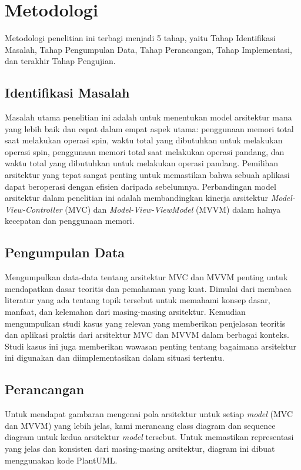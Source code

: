 \documentclass[conference]{IEEEtran}
\begin{document}
	\section{Metodologi}
	Metodologi penelitian ini terbagi menjadi 5 tahap, yaitu Tahap Identifikasi Masalah, Tahap Pengumpulan Data, Tahap Perancangan, Tahap Implementasi, dan terakhir Tahap Pengujian.
	\subsection{Identifikasi Masalah}
	 Masalah utama penelitian ini adalah untuk menentukan model arsitektur mana yang lebih baik dan cepat dalam empat aspek utama: penggunaan memori total saat melakukan operasi spin, waktu total yang dibutuhkan untuk melakukan operasi spin, penggunaan memori total saat melakukan operasi pandang, dan waktu total yang dibutuhkan untuk melakukan operasi pandang. Pemilihan arsitektur yang tepat sangat penting untuk memastikan bahwa sebuah aplikasi dapat beroperasi dengan efisien daripada sebelumnya. Perbandingan model arsitektur dalam penelitian ini adalah membandingkan kinerja arsitektur \textit{Model-View-Controller} (MVC) dan \textit{Model-View-ViewModel} (MVVM) dalam halnya kecepatan dan penggunaan memori.
	
	\subsection{Pengumpulan Data}
	Mengumpulkan data-data tentang arsitektur MVC dan MVVM penting untuk mendapatkan dasar teoritis dan pemahaman yang kuat. Dimulai dari membaca literatur yang ada tentang topik tersebut untuk memahami konsep dasar, manfaat, dan kelemahan dari masing-masing arsitektur. Kemudian mengumpulkan studi kasus yang relevan yang memberikan penjelasan teoritis dan aplikasi praktis dari arsitektur MVC dan MVVM dalam berbagai konteks. Studi kasus ini juga memberikan wawasan penting tentang bagaimana arsitektur ini digunakan dan diimplementasikan dalam situasi tertentu.
	
	\subsection{Perancangan}
	Untuk mendapat gambaran mengenai pola arsitektur untuk setiap \textit{model} (MVC dan MVVM) yang lebih jelas, kami merancang class diagram dan sequence diagram untuk kedua arsitektur \textit{model} tersebut. Untuk memastikan representasi yang jelas dan konsisten dari masing-masing arsitektur, diagram ini dibuat menggunakan kode PlantUML. 
	
\end{document}
